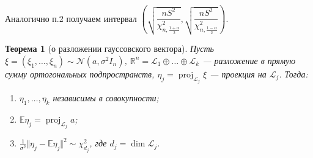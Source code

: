 \documentclass[12pt]{report}
\newtheorem{theorem}{Теорема}
\theoremstyle{definition}
\begin{document}
Аналогично п.2 получаем интервал $\left(\sqrt{\dfrac{nS^2}{\chi^2_{n, \frac{1+\alpha}{2}}}}, \sqrt{\dfrac{nS^2}{\chi^2_{n, \frac{1-\alpha}{2}}}}\right)$.

\begin{theorem}[о разложении гауссовского вектора]
	Пусть $\xi = (\xi_1, \dots, \xi_n) \sim \mathcal{N} (a, \sigma^2 I_n)$,  $\mathbb{R}^n = \mathcal{L}_1 \oplus \dots \oplus \mathcal{L}_k$ — разложение в прямую сумму ортогональных подпространств, $\eta_j = \operatorname{proj}_{\mathcal{L}_j} \xi$ — проекция на $\mathcal{L}_j$. Тогда:
	\begin{enumerate}
		\item $\eta_1, \dots, \eta_k$ независимы в совокупности;
		\item $\mathbb{E}\eta_j = \operatorname{proj}_{\mathcal{L}_j} a$;
		\item $\frac{1}{\sigma^2}\Vert \eta_j - \mathbb{E}\eta_j \Vert^2 \sim \chi^2_{d_j}$, где $d_j = \dim \mathcal{L}_j$.
	\end{enumerate}
\end{theorem}
\end{document}
